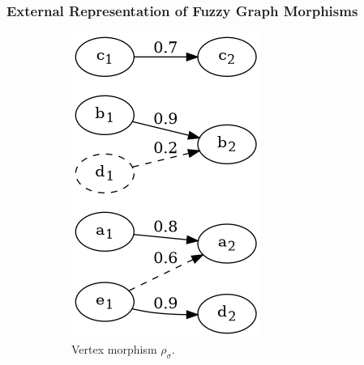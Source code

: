 \begin{frame}
	\frametitle{External Representation of Fuzzy Graph Morphisms}


	\begin{figure}[htbp]
		\centering
		\begin{subfigure}[t]{0.20\textwidth}
			\centering
			\includegraphics[width=\linewidth,valign=t]{inc/fuzzy_graph_theory/fuzzy_graph_morphism_external_rho_sigma.png}
			\caption{Vertex morphism $\rho_{\sigma}$.}
		\end{subfigure}
		\quad
		\begin{subfigure}[t]{0.20\textwidth}

\end{subfigure}
\end{figure}
\end{frame}
